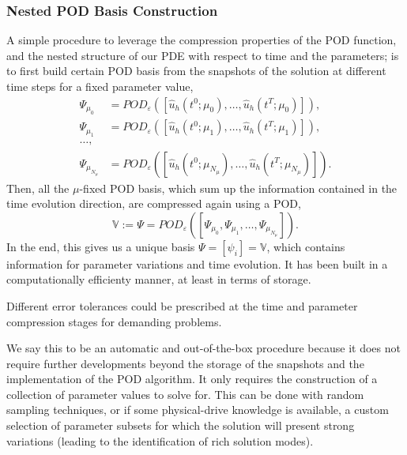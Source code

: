 \documentclass[../../thesis.tex]{subfiles}
\newcommand{\rbV}{\ensuremath{\mathbb{V}}}
\begin{document}

\subsubsection{Nested POD Basis Construction}
\label{sec:1d_rom_burgers_basis_construction_nested}
A simple procedure to leverage the compression properties of the POD function, 
and the nested structure of our PDE with respect to time and the parameters; 
is to first build certain POD basis from the snapshots of the solution at different time steps for a fixed parameter value,
\begin{align*}
    \Psi_{\mu_0} &= POD_{\varepsilon}\left(\left[\hat{u}_h(t^0; \mu_0), \ldots, \hat{u}_h(t^T; \mu_0)\right]\right), \\
    \Psi_{\mu_1} &= POD_{\varepsilon}\left(\left[\hat{u}_h(t^0; \mu_1), \ldots, \hat{u}_h(t^T; \mu_1)\right]\right), \\  
    \ldots, \\
    \Psi_{\mu_{N_{\mu}}} &= POD_{\varepsilon}\left(\left[\hat{u}_h(t^0; \mu_{N_{\mu}}), \ldots, \hat{u}_h(t^T; \mu_{N_{\mu}})\right]\right).
\end{align*}
Then, all the $\mu$-fixed POD basis, which sum up the information contained in the time evolution direction, are compressed again using a POD,
\begin{equation*}
    \rbV := \Psi = POD_{\varepsilon} \left(\left[\Psi_{\mu_0}, \Psi_{\mu_1}, \ldots, \Psi_{\mu_{N_{\mu}}}\right]\right).
\end{equation*}
In the end, this gives us a unique basis $\Psi = [\psi_i] = \rbV$, 
which contains information for parameter variations and time evolution.
It has been built in a computationally efficienty manner, 
at least in terms of storage.

Different error tolerances could be prescribed at the time and parameter compression stages
for demanding problems.

We say this to be an automatic and out-of-the-box procedure because it does not require further developments 
beyond the storage of the snapshots and the implementation of the POD algorithm.
It only requires the construction of a collection of parameter values to solve for.
This can be done with random sampling techniques, 
or if some physical-drive knowledge is available, 
a custom selection of parameter subsets for which the solution will present strong variations 
(leading to the identification of rich solution modes).
\end{document}
